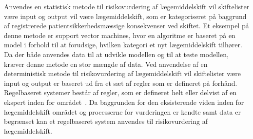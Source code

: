 Anvendes en statistisk metode til risikovurdering af lægemiddelskift vil skiftelister være input og output vil være lægemiddelskift, som er kategoriseret på baggrund af registrerede patientsikkerhedsmæssige konsekvenser ved skiftet. Et eksempel på denne metode er support vector machines, hvor en algoritme er baseret på en model i forhold til at forudsige, hvilken kategori et nyt lægemiddelskift tilhører. Da der både anvendes data til at udvikle modellen og til at teste modellen, kræver denne metode en stor mængde af data. Ved anvendelse af en deterministisk metode til risikovurdering af lægemiddelskift vil skiftelister være input og output er baseret ud fra et sæt af regler som er defineret på forhånd. Regelbaseret systemer består af regler, som er defineret helt eller delvist af en ekspert inden for området~\citep{Crina2008}. Da baggrunden for den eksisterende viden inden for lægemiddelskift området og processerne for vurderingen er kendte samt data er begrænset kan et regelbaseret system anvendes til risikovurdering af lægemiddelskift. 
 





